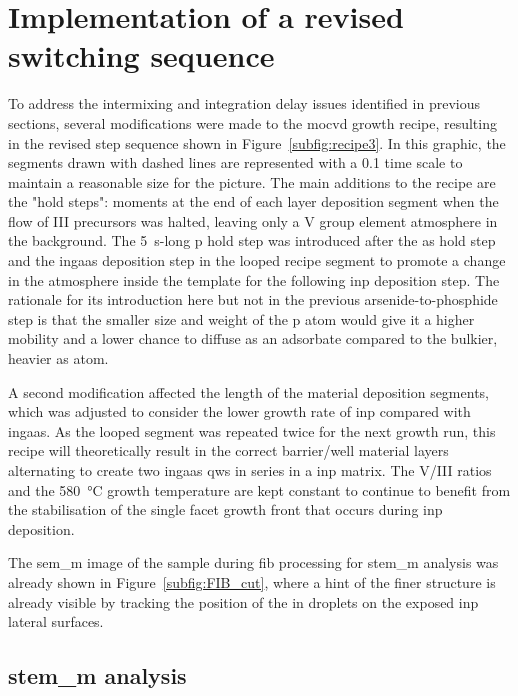 \section{Implementation of a revised switching sequence}
\label{sec:s3}

To address the intermixing and integration delay issues identified in previous sections, several modifications were made to the \acs{mocvd} growth recipe, resulting in the revised step sequence shown in Figure~\ref{subfig:recipe3}. In this graphic, the segments drawn with dashed lines are represented with a \num{0.1} time scale to maintain a reasonable size for the picture. The main additions to the recipe are the "hold steps": moments at the end of each layer deposition segment when the flow of III precursors was halted, leaving only a V group element atmosphere in the background. The \qty{5}{s}-long \acl{p} hold step was introduced after the \acl{as} hold step and the \acs{ingaas} deposition step in the looped recipe segment to promote a change in the atmosphere inside the template for the following \acs{inp} deposition step. The rationale for its introduction here but not in the previous arsenide-to-phosphide step is that the smaller size and weight of the \acl{p} atom would give it a higher mobility and a lower chance to diffuse as an adsorbate compared to the bulkier, heavier \acl{as} atom. 

A second modification affected the length of the material deposition segments, which was adjusted to consider the lower growth rate of \acs{inp} compared with \acs{ingaas}. As the looped segment was repeated twice for the next growth run, this recipe will theoretically result in the correct barrier/well material layers alternating to create two \acs{ingaas} \acl{qw}s in series in a \acs{inp} matrix. The V/III ratios and the \qty{580}{\degreeCelsius} growth temperature are kept constant to continue to benefit from the stabilisation of the single  facet growth front that occurs during \acs{inp} deposition.

The \acs{sem_m} image of the sample during \acs{fib} processing for \acs{stem_m} analysis was already shown in Figure~\ref{subfig:FIB_cut}, where a hint of the finer structure is already visible by tracking the position of the \acl{in} droplets on the exposed \acs{inp} lateral surfaces.

\subsection{\texorpdfstring{\acs{stem_m} analysis}{STEM analysis}}


